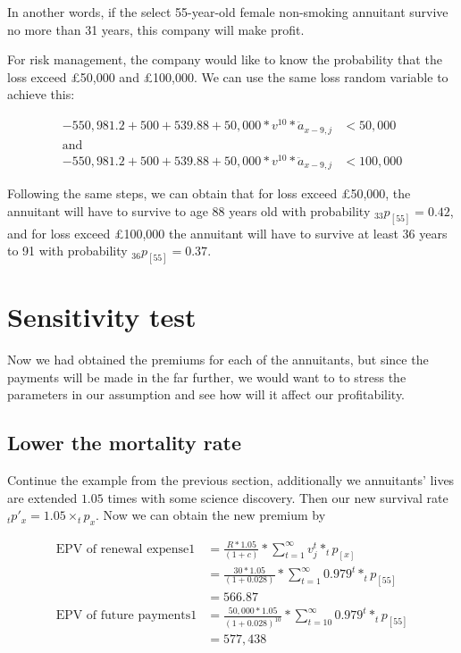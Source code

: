 \documentclass{report}
\begin{document}
In another words, if the select 55-year-old female non-smoking annuitant survive no more than 31 years, this company will make profit. 

For risk management, the company would like to know the probability that the loss exceed \pounds50,000 and \pounds100,000. We can use the same loss random variable to achieve this:

 \begin{align*}
   -550,981.2 +500+ 539.88 + 50,000*v^{10}*\ddot{a}_{x-9,j}  &< 50,000 \\
\text{and}\\
-550,981.2 +500+ 539.88 + 50,000*v^{10}*\ddot{a}_{x-9,j}  &< 100,000 
\end{align*}

Following the same steps, we can obtain that for loss exceed \pounds50,000, the annuitant will have to survive to age 88 years old with probability $_{33}p_{[55]} = 0.42$, and for loss exceed \pounds100,000 the annuitant will have to survive at least 36 years to 91 with probability $_{36}p_{[55]} = 0.37$. 


\section{Sensitivity test}

Now we had obtained the premiums for each of the annuitants, but since the payments will be made in the far further, we would want to to stress the parameters in our assumption and see how will it affect our profitability.


\subsection{Lower the mortality rate}

Continue the example from the previous section, additionally we annuitants' lives are extended $1.05$ times with some science discovery. Then our new survival rate $_tp'_x = 1.05\times _tp_x$. Now we can obtain the new premium by 

\begin{align}
        \text{EPV of renewal expense1}&= \frac{R*1.05}{(1+c)} * \sum_{t=1}^{\infty} v_j^t * _tp_{[x]} \nonumber \\
         &= \frac{30*1.05}{(1+0.028)} * \sum_{t=1}^{\infty} 0.979^t * _tp_{[55]} \nonumber\\
         &= 566.87\nonumber\\
        \text{EPV of future payments1} &= \frac{50,000*1.05}{(1+0.028)^{10}} * \sum_{t=10}^{\infty} 0.979^t * _tp_{[55]} \nonumber\\ 
         &=577,438 \nonumber
\end{align}
\end{document}
